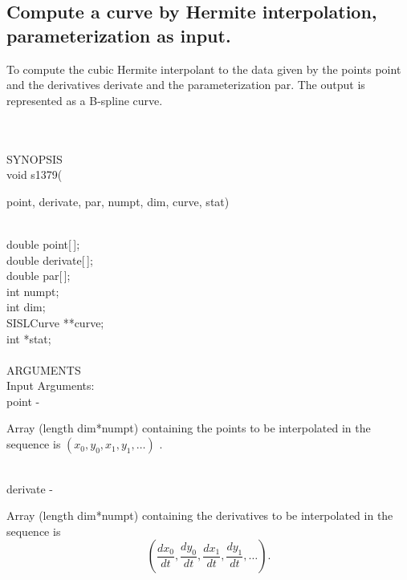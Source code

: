 \subsection{Compute a curve by Hermite interpolation,
parameter\-ization as input.}
\begin{minipg1}
To compute the cubic Hermite interpolant to the data given by the points
point and the derivatives derivate and the parameterization par.
The output is represented as a B-spline curve.
\end{minipg1}\\ \\
SYNOPSIS\\
        \>void s1379(\begin{minipg3}
                {\fov point}, {\fov derivate}, {\fov par}, {\fov numpt}, {\fov dim}, {\fov curve}, {\fov stat})
                \end{minipg3}\\
                \>\>    double  \>      {\fov point}[\,];\\
                \>\>    double  \>      {\fov derivate}[\,];\\
                \>\>    double  \>      {\fov par}[\,];\\
                \>\>    int     \>      {\fov numpt};\\
                \>\>    int     \>      {\fov dim};\\
                \>\>    SISLCurve       \>      **{\fov curve};\\
                \>\>    int     \>      *{\fov stat};\\
\\
ARGUMENTS\\
        \>Input Arguments:\\
        \>\>    {\fov point}    \> - \> \begin{minipg2}
                                Array (length dim*numpt) containing the
                                points to be interpolated in the sequence is
                                $(x_{0},y_{0},x_{1},y_{1},\ldots)$
                                .
                                \end{minipg2}\\[0.3ex]
        \>\>    {\fov derivate}\> - \>  \begin{minipg2}
                                Array (length dim*numpt) containing the
                                derivatives to be interpolated in the sequence is
                                \[
                                (\frac{dx_{0}}{dt},\frac{dy_{0}}{dt},
                                \frac{dx_{1}}{dt},\frac{dy_{1}}{dt},\ldots).
                                \]
                                \end{minipg2}\\[0.8ex]
